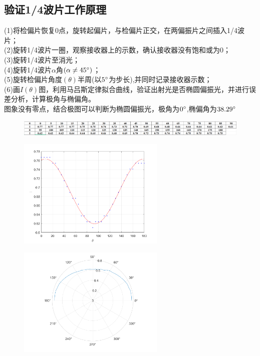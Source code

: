 \documentclass{article}
\begin{document}
\subsection{验证1/4波片工作原理}
(1)将检偏片恢复0点，旋转起偏片，与检偏片正交，在两偏振片之间插入1/4波片；\\
(2)旋转1/4波片一圈，观察接收器上的示数，确认接收器没有饱和或为0；\\
(3)旋转1/4波片至消光；\\
(4)旋转1/4波片$\alpha$角$(\alpha\neq 45\degree)$；\\
(5)旋转检偏片角度$(\theta)$半周(以$5\degree$为步长),并同时记录接收器示数；\\
(6)画\(I(\theta)\)图，利用马吕斯定律拟合曲线，验证出射光是否椭圆偏振光，并进行误差分析，计算极角与椭偏角。\\
\hspace*{2em}图象没有零点，结合极图可以判断为椭圆偏振光，极角为$0\degree$,椭偏角为$38.29\degree$
\begin{figure}[ht]
    \centering
    \includegraphics[width=12cm]{5.3.png}
\end{figure}
\begin{figure}[!h]
    \centering
    \includegraphics[width=7cm]{3.png}
\end{figure}
\begin{figure}[!h]
    \centering
    \includegraphics[width=7cm]{33.png}
\end{figure}
\end{document}
